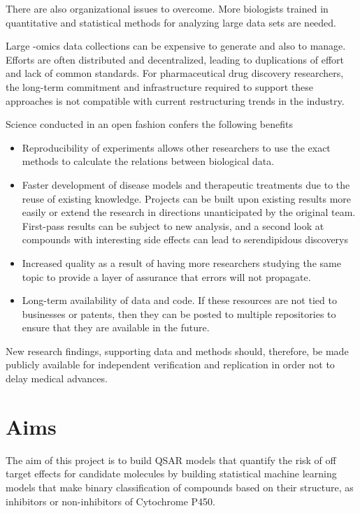There are also organizational issues to overcome. More biologists trained in quantitative and statistical methods for analyzing large data sets are needed. 

Large -omics data collections can be expensive to generate and also to manage. Efforts are often distributed and decentralized, leading to duplications of effort and lack of common standards. For pharmaceutical drug discovery researchers, the long-term commitment and infrastructure required to support these approaches is not compatible with current restructuring trends in the industry.\cite{Berg2014}

Science conducted in an open fashion confers the following benefits

\begin{itemize}

\item Reproducibility of experiments allows other researchers to use the exact methods to calculate the relations between biological data.

\item Faster development of disease models and therapeutic treatments due to the reuse of existing knowledge. Projects can be built upon existing results more easily or extend the research in directions unanticipated by the original team. First-pass results can be subject to new analysis, and a second look at compounds with interesting side effects can lead to serendipidous discoverys

\item Increased quality as a result of having more researchers studying the same topic to provide a layer of assurance that errors will not propagate.

\item Long-term availability of data and code. If these resources are not tied to businesses or patents, then they can be posted to multiple repositories to ensure that they are available in the future.
\cite{Prlic2012}

\end{itemize}

New research findings, supporting data and methods should, therefore, be made publicly available for independent verification and replication in order not to delay medical advances.



\section{Aims}
The aim of this project is to build QSAR models that quantify the risk of off target effects for candidate molecules by building statistical machine learning models that make binary classification of compounds based on their structure, as inhibitors or non-inhibitors of Cytochrome P450.

